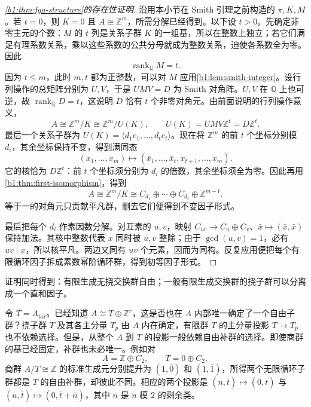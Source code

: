 \begin{proof}[\cref{b1:thm:fga-structure}的存在性证明]
	沿用本小节在 Smith 引理之前构造的 \(\pi,K,M\)。若 \(t=0\)，则 \(K=0\) 且 \(A\cong\mathbb Z^m\)，所需分解已经得到。以下设 \(t>0\)。先确定非零主元的个数：\(M\) 的 \(t\) 列是关系子群 \(K\) 的一组基，所以在整数上独立；若它们满足有理系数关系，乘以这些系数的公共分母就成为整数关系，迫使各系数全为零。因此
	\[
		\operatorname{rank}_{\mathbb Q}M=t.
	\]
	因为 \(t\le m\)，此时 \(m,t\) 都为正整数，可以对 \(M\) 应用\cref{b1:lem:smith-integer}。设行列操作的总矩阵分别为 \(U,V\)，于是 \(UMV=D\) 为 Smith 对角阵。\(U,V\) 在 \(\mathbb Q\) 上也可逆，故 \(\operatorname{rank}_{\mathbb Q}D=t\)，这说明 \(D\) 恰有 \(t\) 个非零对角元。由前面说明的行列操作意义，
	\[
		A\cong\mathbb Z^m/K\cong\mathbb Z^m/U(K), \qquad U(K)=UMV\mathbb Z^t=D\mathbb Z^t.
	\]
	最后一个关系子群为 \(U(K)=\langle d_1e_1,\ldots,d_te_t\rangle\)。现在将 \(\mathbb Z^m\) 的前 \(t\) 个坐标分别模 \(d_i\)，其余坐标保持不变，得到满同态
	\[
		(x_1,\ldots,x_m)\longmapsto (\bar x_1,\ldots,\bar x_t,x_{t+1},\ldots,x_m).
	\]
	它的核恰为 \(D\mathbb Z^t\)：前 \(t\) 个坐标须分别为 \(d_i\) 的倍数，其余坐标须全为零。因此再用\cref{b1:thm:first-isomorphism}，得到
	\[
		A\cong \mathbb Z^m/K \cong C_{d_1}\oplus\cdots\oplus C_{d_t}\oplus\mathbb Z^{m-t}.
	\]
	等于一的对角元只贡献平凡群，删去它们便得到不变因子形式。

	最后把每个 \(d_i\) 作素因数分解。对互素的 \(u,v\)，映射 \(C_{uv}\to C_u\oplus C_v\)、\(\bar x\mapsto(\bar x,\bar x)\) 保持加法。其核中整数代表 \(x\) 同时被 \(u,v\) 整除；由于 \(\gcd(u,v)=1\)，必有 \(uv\mid x\)，所以核平凡。两边又同有 \(uv\) 个元素，因而为同构。反复应用便把每个有限循环因子拆成素数幂阶循环群，得到初等因子形式。
\end{proof}

证明同时得到：有限生成无挠交换群自由；一般有限生成交换群的挠子群可以分离成一个直和因子。

\ProseParagraphBreak
令 \(T=A_{\mathrm{tor}}\)。已经知道 \(A\cong T\oplus\mathbb Z^r\)，这是否也在 \(A\) 内部唯一确定了一个自由子群？挠子群 \(T\) 及其各主分量 \(T_p\) 由 \(A\) 内在确定，有限群 \(T\) 的主分量投影 \(T\to T_p\) 也不依赖选择。但是，从整个 \(A\) 到 \(T\) 的投影一般依赖自由补群的选择。即使商群的基已经固定，补群也未必唯一。例如对
\[
	A=\mathbb Z\oplus C_2,\qquad T=0\oplus C_2,
\]
商群 \(A/T\cong\mathbb Z\) 的标准生成元分别提升为 \((1,\bar0)\) 和 \((1,\bar1)\)，所得两个无限循环子群都是 \(T\) 的自由补群，却彼此不同。相应的两个投影是 \((n,\bar t)\mapsto(0,\bar t)\) 与 \((n,\bar t)\mapsto(0,\bar t+\bar n)\)，其中 \(\bar n\) 是 \(n\) 模 \(2\) 的剩余类。

